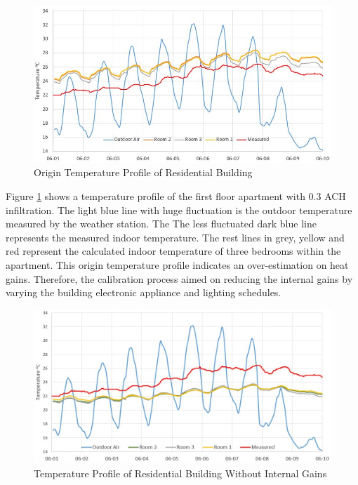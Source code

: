 \documentclass[a4paper, oneside]{discothesis}
\begin{document}
			\begin{figure}[H]
			\centering
			\includegraphics[scale=0.7]{figures/Hongg_Clibration_Origin.JPG}
			\caption{Origin Temperature Profile of Residential Building}
			\label{fig:HonggCalibrationOrigin}
			\end{figure}
			
			Figure \ref{fig:HonggCalibrationOrigin} shows a temperature profile of the first floor apartment with 0.3 ACH infiltration. The light blue line with huge fluctuation is the outdoor temperature measured by the weather station. The The less fluctuated dark blue line represents the measured indoor temperature. The rest lines in grey, yellow and red represent the calculated indoor temperature of three bedrooms within the apartment. This origin temperature profile indicates an over-estimation on heat gains. Therefore, the calibration process aimed on reducing the internal gains by varying the building electronic appliance and lighting schedules.\\
			
			\begin{figure}[H]
			\centering
			\includegraphics[scale=0.57]{figures/Hongg_Cali_NoFacility.JPG}
			\caption{Temperature Profile of Residential Building Without Internal Gains}
			\label{fig:HonggCalibrationNoGains}
			\end{figure}
			
\end{document}

